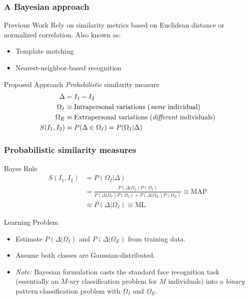 \documentclass{beamer}
\begin{document}
\begin{frame}
\frametitle{A Bayesian approach}
\begin{block}{Previous Work}
Rely on similarity metrics based on Euclidean distance or normalized correlation.
\pause
Also known as:
\begin{itemize}
\item Template matching
\item Nearest-neighbor-based recognition
\end{itemize}
\end{block}
\pause
\begin{block}{Proposed Approach}
\emph{Probabilistic} similarity measure
\pause
\begin{align}
\Delta& = I_1 - I_2 \\
\Omega_I& \equiv \text{Intrapersonal variations (\emph{same} individual)} \\
\Omega_E& \equiv \text{Extrapersonal variations (\emph{different} individuals)} \\
S(I_1,I_2)& = P(\Delta \in \Omega_I) = P(\Omega_I | \Delta)
\end{align}
\end{block}
\end{frame}

\begin{frame}
\frametitle{Probabilistic similarity measures}
\begin{block}{Bayes Rule}
\begin{equation}
\begin{split}
S(I_1,I_2)& = P(\Omega_I | \Delta) \\
& = \frac{P(\Delta|\Omega_I)P(\Omega_I)}{P(\Delta|\Omega_I)P(\Omega_I)+P(\Delta|\Omega_E)P(\Omega_E)}\equiv \text{MAP} \\
& \approx P(\Delta|\Omega_I)\equiv \text{ML}
\end{split}
\end{equation}
\end{block}
\pause
\begin{block}{Learning Problem}
\begin{itemize}
\item Estimate $P(\Delta|\Omega_I)$ and $P(\Delta|\Omega_E)$ from training data.
\pause
\item Assume both classes are Gaussian-distributed.
\pause
\item \emph{Note:} Bayesian formulation casts the standard face recognition task (essentially an $M$-ary classification problem for $M$ individuals) into a \emph{binary} pattern classification problem with $\Omega_I$ and $\Omega_E$.
\end{itemize}
\end{block}
\end{frame}
\end{document}
